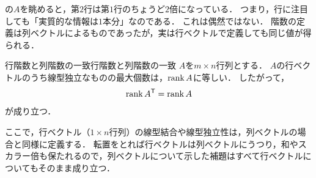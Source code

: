 の$A$を眺めると，第$2$行は第$1$行のちょうど$2$倍になっている．
つまり，行に注目しても「実質的な情報は$1$本分」なのである．
これは偶然ではない．
階数の定義は列ベクトルによるものであったが，実は行ベクトルで定義しても同じ値が得られる．

\begin{theorem}{行階数と列階数の一致}{行階数と列階数の一致}
  $A$を$m \times n$行列とする．
  $A$の行ベクトルのうち線型独立なものの最大個数は，$\operatorname{rank} A$に等しい．
  したがって，
  \[
    \operatorname{rank} A^\mathsf{T} = \operatorname{rank} A
  \]
  が成り立つ．
\end{theorem}

ここで，行ベクトル（$1 \times n$行列）の線型結合や線型独立性は，列ベクトルの場合と同様に定義する．
転置をとれば行ベクトルは列ベクトルにうつり，和やスカラー倍も保たれるので，列ベクトルについて示した補題はすべて行ベクトルについてもそのまま成り立つ．

